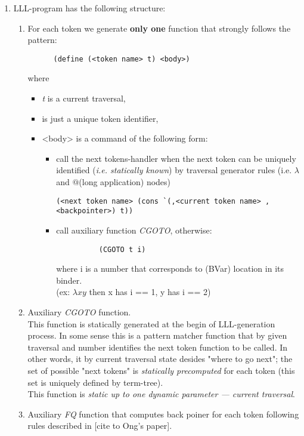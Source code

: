 \documentclass[a4paper, 10pt]{article}
\begin{document}
\begin{enumerate}
\item LLL-program has the following structure:
  \begin{enumerate}
  \item For each token we generate \textbf{only one} function that strongly follows the pattern:
    \begin{verbatim}
      (define (<token name> t) <body>)
    \end{verbatim}
    {\color{red}where}
    \begin{itemize}
    \item \textit{t} is a current traversal,
    \item <token name> is just a unique token identifier,
    \item <body> is a command of the following form:
      \begin{itemize}
      \item call the next tokens-handler when the next token can be uniquely identified (\textit{i.e. statically known}) by traversal generator rules (i.e. $\lambda$ and $@$(long application) nodes)
        \begin{verbatim}
(<next token name> (cons `(,<current token name> ,<backpointer>) t))
        \end{verbatim}
      \item call auxiliary function \textit{CGOTO}, otherwise:
        \begin{verbatim}
          (CGOTO t i)
        \end{verbatim}
        {\color{red}where} i is a number that corresponds to (BVar) location in its binder.\\
        (ex: $\lambda x y$ then x has i == 1, y has i == 2)
      \end{itemize}
    \end{itemize}
  \item Auxiliary \textit{CGOTO} function.\\
    This function is statically generated at the begin of LLL-generation process. In some sense this is a pattern matcher function that by given traversal and number identifies the next token function to be called. In other words, it by current traversal state desides "where to go next"; the set of possible "next tokens" is \textit{statically precomputed} for each token (this set is uniquely defined by term-tree).\\
    This function is \textit{static up to one dynamic parameter --- current traversal}.
  \item Auxiliary \textit{FQ} function that computes back poiner for each token following rules described in [cite to Ong's paper].
  \end{enumerate}
  

\end{enumerate}
\end{document}
